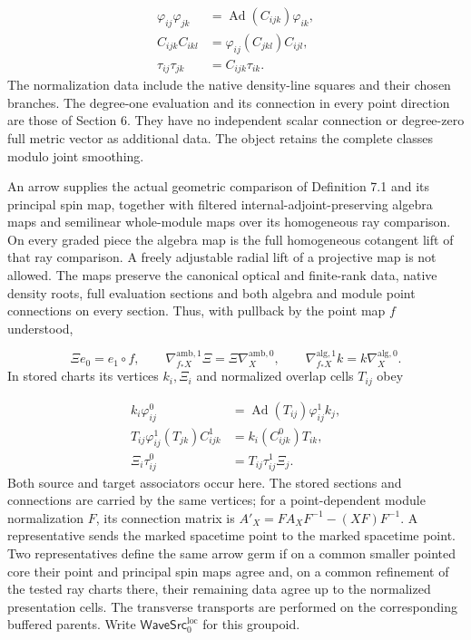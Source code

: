 \documentclass[
  english,
  11pt,
  reqno]{amsart}
\begin{document}
\label{eq:online-stored-source-descent-equations} \[
\begin{aligned}
\varphi_{ij}\varphi_{jk}&=\operatorname{Ad}(C_{ijk})\varphi_{ik},\\
C_{ijk}C_{ikl}&=\varphi_{ij}(C_{jkl})C_{ijl},\\
\tau_{ij}\tau_{jk}&=C_{ijk}\tau_{ik}.
\end{aligned}
\] The normalization data include the native density-line squares and
their chosen branches. The degree-one evaluation and its connection in
every point direction are those of Section 6. They have no independent
scalar connection or degree-zero full metric vector as additional data.
The object retains the complete classes modulo joint smoothing.

An arrow supplies the actual geometric comparison of Definition 7.1 and
its principal spin map, together with filtered
internal-adjoint-preserving algebra maps and semilinear whole-module
maps over its homogeneous ray comparison. On every graded piece the
algebra map is the full homogeneous cotangent lift of that ray
comparison. A freely adjustable radial lift of a projective map is not
allowed. The maps preserve the canonical optical and finite-rank data,
native density roots, full evaluation sections and both algebra and
module point connections on every section. Thus, with pullback by the
point map \(f\) understood,

\label{eq:online-complete-source-arrow-point-tests} \[
\Xi e_0=e_1\circ f,\qquad
\nabla^{\mathrm{amb},1}_{f_*X}\Xi=\Xi\nabla^{\mathrm{amb},0}_X,\qquad
\nabla^{\mathrm{alg},1}_{f_*X}k=k\nabla^{\mathrm{alg},0}_X.
\] In stored charts its vertices \(k_i,\Xi_i\) and normalized overlap
cells \(T_{ij}\) obey

\label{eq:online-complete-source-two-associator-tests} \[
\begin{aligned}
k_i\varphi^0_{ij}
 &=\operatorname{Ad}(T_{ij})\varphi^1_{ij}k_j,\\
T_{ij}\varphi^1_{ij}(T_{jk})C^1_{ijk}
 &=k_i(C^0_{ijk})T_{ik},\\
\Xi_i\tau^0_{ij}
 &=T_{ij}\tau^1_{ij}\Xi_j.
\end{aligned}
\] Both source and target associators occur here. The stored sections
and connections are carried by the same vertices; for a point-dependent
module normalization \(F\), its connection matrix is
\(A'_X=FA_XF^{-1}-(XF)F^{-1}\). A representative sends the marked
spacetime point to the marked spacetime point. Two representatives
define the same arrow germ if on a common smaller pointed core their
point and principal spin maps agree and, on a common refinement of the
tested ray charts there, their remaining data agree up to the normalized
presentation cells. The transverse transports are performed on the
corresponding buffered parents. Write
\(\mathsf{WaveSrc}^{\mathrm{loc}}_0\) for this groupoid.
\end{document}
